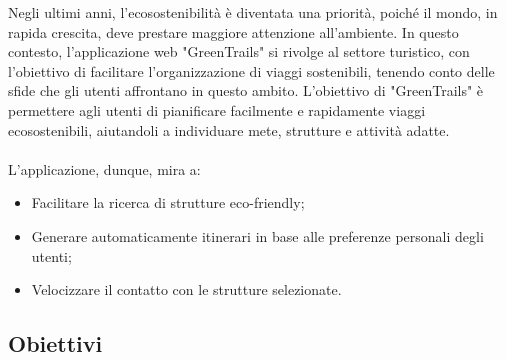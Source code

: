 \documentclass{CSUniSchoolLabReport}
\begin{document}
Negli ultimi anni, l'ecosostenibilità è diventata una priorità, poiché il mondo, in rapida crescita, deve prestare maggiore attenzione all'ambiente. In questo contesto, l'applicazione web "GreenTrails" si rivolge al settore turistico, con l'obiettivo di facilitare l'organizzazione di viaggi sostenibili, tenendo conto delle sfide che gli utenti affrontano in questo ambito.
L'obiettivo di "GreenTrails" è permettere agli utenti di pianificare facilmente e rapidamente viaggi ecosostenibili, aiutandoli a individuare mete, strutture e attività adatte. \\\\
L'applicazione, dunque, mira a:
\begin{itemize}
    \item Facilitare la ricerca di strutture eco-friendly;
    \item Generare automaticamente itinerari in base alle preferenze personali degli utenti;
    \item Velocizzare il contatto con le strutture selezionate.
\end{itemize}

\pagebreak{}

\subsection{Obiettivi}
\end{document}
